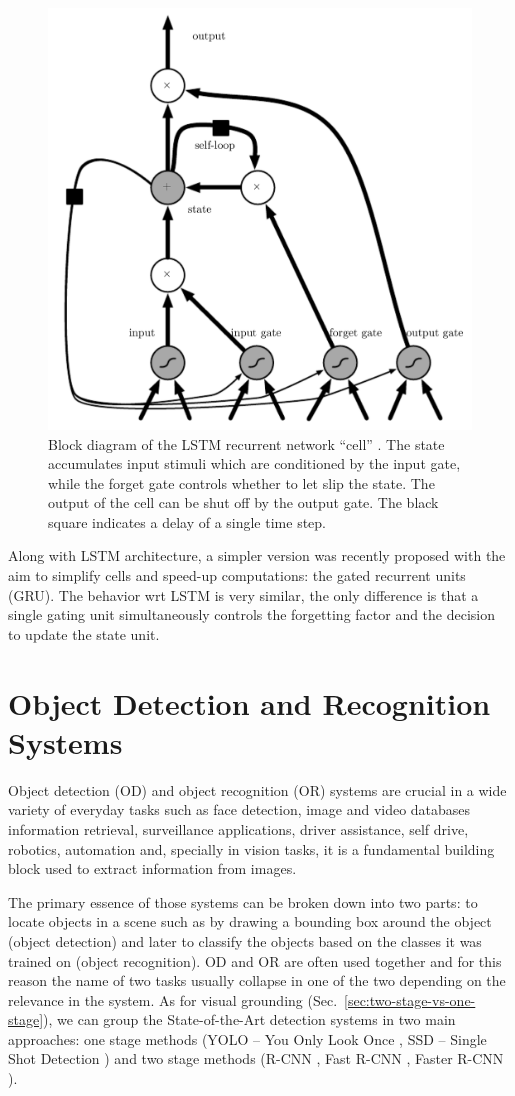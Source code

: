 \begin{figure}
  \centering
  \includegraphics[width=.6\textwidth]{figures/lstm.png}
  \caption[Block diagram of the LSTM recurrent network cell]{ Block
    diagram of the LSTM recurrent network ``cell''
    \cite{goodfellow2016deep}. The state accumulates input stimuli
    which are conditioned by the input gate, while the forget gate
    controls whether to let slip the state. The output of the cell can
    be shut off by the output gate. The black square indicates a delay
    of a single time step. }
  \label{fig:lstm}
\end{figure}

Along with LSTM architecture, a simpler version was recently proposed
with the aim to simplify cells and speed-up computations: the gated
recurrent units (GRU). The behavior wrt LSTM is very similar, the only
difference is that a single gating unit simultaneously controls the
forgetting factor and the decision to update the state unit.

\section{Object Detection and Recognition Systems}
\label{sec:object-detection-recognition}

Object detection (OD) and object recognition (OR) systems are crucial
in a wide variety of everyday tasks such as face detection, image and
video databases information retrieval, surveillance applications,
driver assistance, self drive, robotics, automation and, specially in
vision tasks, it is a fundamental building block used to extract
information from images.

The primary essence of those systems can be broken down into two
parts: to locate objects in a scene such as by drawing a bounding box
around the object (object detection) and later to classify the objects
based on the classes it was trained on (object recognition). OD and OR
are often used together and for this reason the name of two tasks
usually collapse in one of the two depending on the relevance in the
system. As for visual grounding
(Sec.~\ref{sec:two-stage-vs-one-stage}), we can group the
State-of-the-Art detection systems in two main approaches: one stage
methods (YOLO -- You Only Look Once \cite{redmon2016you}, SSD --
Single Shot Detection \cite{liu2016ssd}) and two stage methods (R-CNN
\cite{girshick2014rich}, Fast R-CNN \cite{girshick2015fast}, Faster
R-CNN \cite{ren2015faster}). 

